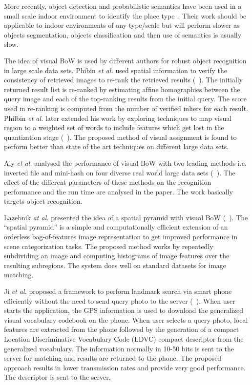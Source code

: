 More recently, 
object detection and probabilistic semantics have been used in a
small scale indoor
environment to identify the place type~\cite{espinace10}. 
Their work should be applicable to indoor 
environments of any type/scale
but will perform slower as objects 
segmentation, objects classification 
and then use of semantics is usually slow.

The idea of visual BoW is used by different authors 
for robust object recognition in large scale data sets. 
Phibin \emph{et al.} used spatial information 
to verify the consistency of retrieved images 
to re-rank the retrieved results (~\citet{philbin07}).
The initially returned result list is re-ranked by estimating 
afﬁne homographies between the query image and each
of the top-ranking results from the initial query. The score
used in re-ranking is computed from the number of verified 
inliers for each result.
Philbin \emph{et al.} later extended his work 
by exploring techniques to map visual region 
to a weighted set of words to include features
which get lost in the quantization stage (~\citet{philbin08}). 
The proposed method 
of visual assignment is found to perform better than
 state of the art techniques on different large data sets. 

Aly \emph{et al.} analysed the performance of visual 
BoW with two leading methods i.e. inverted file and 
mini-hash on four diverse real world large data sets (~\citet{aly09}). 
The effect of the different parameters
of these methods on the recognition performance
and the run time are analysed in the paper. The work 
basically targets object recognition.

Lazebnik \emph{at al.} presented the idea 
of a spatial pyramid with visual BoW (~\citet{lazebnik06}). 
The “spatial pyramid” is a simple and computationally efficient
extension of an orderless bag-of-features image representation 
to get improved performance in scene categorization tasks.
The proposed method works by repeatedly subdividing
an image and computing histograms of image features
over the resulting subregions. The system does well on 
standard datasets for image matching. 

Ji \emph{et al.} proposed a framework to perform 
landmark search via smart phone efficiently without the 
need to send query photo to the server (~\citet{ji12}).
When user starts the application, the GPS information is 
used to download the generalized visual vocabulary 
codebook on the phone. When user selects a query photo, 
local features are extracted from the phone 
followed by the generation of a compact Location Discriminative 
Vocabulary Code (LDVC) compact descriptor from the 
generalized vocabulary. The information normally in 10-50 bits 
is sent to the server for matching and results are returned 
to the phone. The proposed approach results in lower 
transmission rates and provide very good performance. 
The descriptor is sent to the server, 

